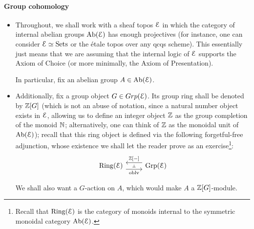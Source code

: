             \paragraph{Group cohomology}
                \begin{convention}
                    \noindent
                    \begin{itemize}
                        \item Throughout, we shall work with a sheaf topos $\mathcal{E}$ in which the category of internal abelian groups $\mathrm{Ab}(\mathcal{E})$ has enough projectives (for instance, one can consider $\mathcal{E} \simeq \mathrm{Sets}$ or the \'etale topos over any qcqs scheme). This essentially just means that we are assuming that the internal logic of $\mathcal{E}$ supports the Axiom of Choice (or more minimally, the Axiom of Presentation). 
                        
                        In particular, fix an abelian group $A \in \mathrm{Ab}(\mathcal{E})$.
                        \item Additionally, fix a group object $G \in Grp(\mathcal{E})$. Its group ring shall be denoted by $\mathbb{Z}[G]$ (which is not an abuse of notation, since a natural number object exists in $\mathcal{E}$, allowing us to define an integer object $\mathbb{Z}$ as the group completion of the monoid $\mathbb{N}$; alternatively, one can think of $\mathbb{Z}$ as the monoidal unit of $\mathrm{Ab}(\mathcal{E})$); recall that this ring object is defined via the following forgetful-free adjunction, whose existence we shall let the reader prove as an exercise\footnote{Recall that $\mathrm{Ring}(\mathcal{E})$ is the category of monoids internal to the symmetric monoidal category $\mathrm{Ab}(\mathcal{E})$.}:
                            $$
                                \begin{tikzcd}
                                	{\Ring(\E)} & {\Grp(\E)}
                                	\arrow[""{name=0, anchor=center, inner sep=0}, "\oblv"', shift right=2, from=1-1, to=1-2]
                                	\arrow[""{name=1, anchor=center, inner sep=0}, "{\Z[-]}"', shift right=2, from=1-2, to=1-1]
                                	\arrow["\dashv"{anchor=center, rotate=-90}, draw=none, from=1, to=0]
                                \end{tikzcd}
                            $$
                            
                        We shall also want a $G$-action on $A$, which would make $A$ a $\mathbb{Z}[G]$-module.
                    \end{itemize}
                \end{convention}
                
